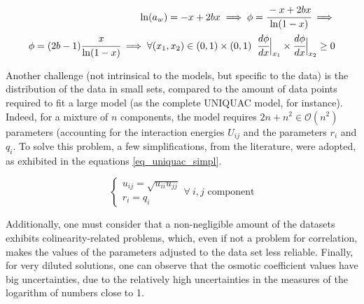 \begin{equation}
	\label{eq_phi_virial_mono_frac}
	\begin{split}
		\ln(a_w) = -x + 2bx \implies \phi =
			\cfrac{-x + 2bx}{\ln(1-x)}\implies\\
		\phi = (2b-1)\cfrac{x}{\ln(1-x)} \implies
			\forall (x_1,x_2) \in (0,1)\times(0,1)\;\;
			\cfrac{d\phi}{dx}\Big|_{x_1} \times
			\cfrac{d\phi}{dx}\Big|_{x_2} \ge 0
	\end{split}
\end{equation}

Another challenge (not intrinsical to the models, but specific to the data)
is the distribution of the data in small sets, compared to the amount of
data points required to fit a large model (as the complete UNIQUAC model,
for instance). Indeed, for a mixture of $n$ components, the model requires
$2n+n^2 \in \mathcal{O}(n^2)$ parameters (accounting for the interaction
energies $U_{ij}$ and the parameters $r_i$ and $q_i$. To solve this problem,
a few simplifications, from the literature, were adopted, as exhibited in
the equations \ref{eq_uniquac_simpl}.

\begin{equation}
	\label{eq_uniquac_simpl}
	\begin{cases}
		u_{ij} = \sqrt{u_{ii}u_{jj}}\\
		r_i = q_i
	\end{cases}\forall\ i, j\text{ component}
\end{equation}

Additionally, one must consider that a non-negligible amount of the datasets
exhibits colinearity-related problems, which, even if not a problem for correlation,
makes the values of the parameters adjusted to the data set less reliable. Finally,
for very diluted solutions, one can observe that the osmotic coefficient values
have big uncertainties, due to the relatively high uncertainties in the measures
of the logarithm of numbers close to 1.


